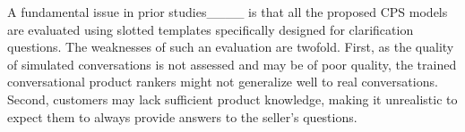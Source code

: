 A fundamental issue in prior studies____ is that all the proposed CPS models are evaluated using slotted templates specifically designed for clarification questions. 
The weaknesses of such an evaluation are twofold. First, as the quality of simulated conversations is not assessed and may be of poor quality, the trained conversational product rankers might not generalize well to real conversations. Second, customers may lack sufficient product knowledge, making it unrealistic to expect them to always provide answers to the seller's questions. %

